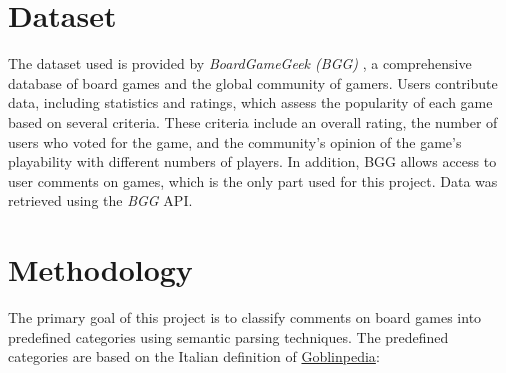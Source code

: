 \documentclass[sn-mathphys-num]{sn-jnl}%
\theoremstyle{thmstyleone}%
\theoremstyle{thmstyletwo}%
\theoremstyle{thmstylethree}%
\begin{document}
\section{Dataset}\label{data}
    The dataset used is provided by \textit{BoardGameGeek (BGG)} \cite{BoardGameGeek}, a comprehensive database of board games and the global community of gamers. Users contribute data, including statistics and ratings, which assess the popularity of each game based on several criteria. These criteria include an overall rating, the number of users who voted for the game, and the community's opinion of the game's playability with different numbers of players. In addition, BGG allows access to user comments on games, which is the only part used for this project. Data was retrieved using the \textit{BGG} API. 

\section{Methodology}\label{meth}
    The primary goal of this project is to classify comments on board games into predefined categories using semantic parsing techniques. The predefined categories are based on the Italian definition of \href{https://www.goblins.net/goblinpedia}{Goblinpedia}: 
\end{document}
